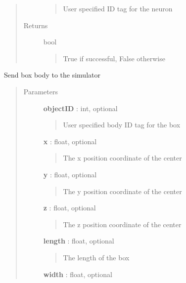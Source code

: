 \documentclass[letterpaper,10pt,english]{sphinxmanual}
\begin{document}
\begin{fulllineitems}
\begin{fulllineitems}
\begin{quote}
\begin{description}
\begin{quote}
User specified ID tag for the neuron
\end{quote}

\item[{Returns}] \leavevmode
bool
\begin{quote}

True if successful, False otherwise
\end{quote}

\end{description}\end{quote}

\end{fulllineitems}


\begin{fulllineitems}
\label{code:pyrosim.PYROSIM.Send_Box}
Send box body to the simulator
\begin{quote}\begin{description}
\item[{Parameters}] \leavevmode
\textbf{objectID} : int, optional
\begin{quote}

User specified body ID tag for the box
\end{quote}

\textbf{x} : float, optional
\begin{quote}

The x position coordinate of the center
\end{quote}

\textbf{y} : float, optional
\begin{quote}

The y position coordinate of the center
\end{quote}

\textbf{z} : float, optional
\begin{quote}

The z position coordinate of the center
\end{quote}

\textbf{length} : float, optional
\begin{quote}

The length of the box
\end{quote}

\textbf{width} : float, optional
\begin{quote}


\end{quote}
\end{description}
\end{quote}
\end{fulllineitems}
\end{fulllineitems}
\end{document}
